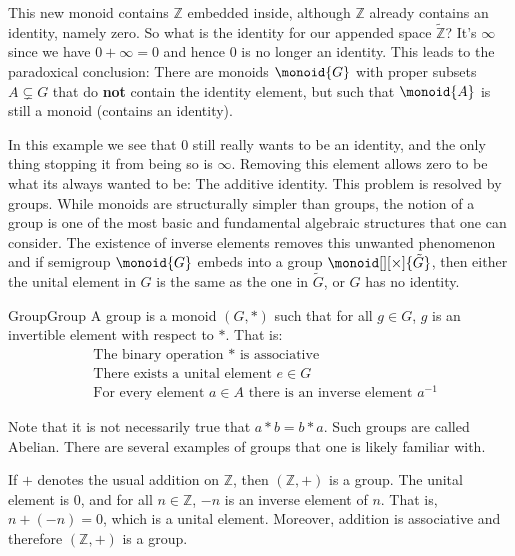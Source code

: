         This new monoid contains $\mathbb{Z}$ embedded inside, although
        $\mathbb{Z}$ already contains an identity, namely zero. So what is the
        identity for our appended space $\tilde{\mathbb{Z}}$? It's $\infty$
        since we have $0+\infty=0$ and hence 0 is no longer an identity. This
        leads to the paradoxical conclusion: There are monoids
        $\monoid{G}$ with proper subsets $A\subsetneq{G}$ that do \textbf{not}
        contain the identity element, but such that $\monoid{A}$ is still a
        monoid (contains an identity).
        \par\hfill\par
        In this example we see that 0 still really wants to be an identity, and
        the only thing stopping it from being so is $\infty$. Removing this
        element allows zero to be what its always wanted to be: The additive
        identity. This problem is resolved by groups. While monoids are
        structurally simpler than groups, the notion of a group is one of the
        most basic and fundamental algebraic structures that one can consider.
        The existence of inverse elements removes this unwanted phenomenon and
        if semigroup $\monoid{G}$ embeds into a group
        $\monoid[][\times]{\tilde{G}}$, then either the unital element in $G$ is
        the same as the one in $\tilde{G}$, or $G$ has no identity.
        \begin{fdefinition}{Group}{Group}
            A group is a \gls{monoid} $(G,*)$ such that for all $g\in{G}$, $g$
            is an \gls{invertible element} with respect to $*$. That is:%
            \begin{align}
                &\label{def:Group_Assoc}
                \textrm{The binary operation }*\textrm{ is associative}\tag{1}\\
                &\label{def:Group_Unit}
                \textrm{There exists a unital element $e\in{G}$}\tag{2}\\
                &\label{def:Group_Inverse}
                \textrm{For every element }a\in{A}
                \textrm{ there is an inverse element }a^{\minus{1}}\tag{3}
            \end{align}
        \end{fdefinition}
        Note that it is not necessarily true that $a*b=b*a$. Such groups are
        called Abelian. There are
        several examples of groups that one is likely familiar with.
        \begin{example}
            If $+$ denotes the usual addition on $\mathbb{Z}$, then
            $(\mathbb{Z},+)$ is a group. The unital element is 0, and for all
            $n\in\mathbb{Z}$, $\minus{n}$ is an inverse element of $n$. That is,
            $n+(\minus{n})=0$, which is a unital element. Moreover, addition is
            associative and therefore $(\mathbb{Z},+)$ is a group.
        \end{example}
